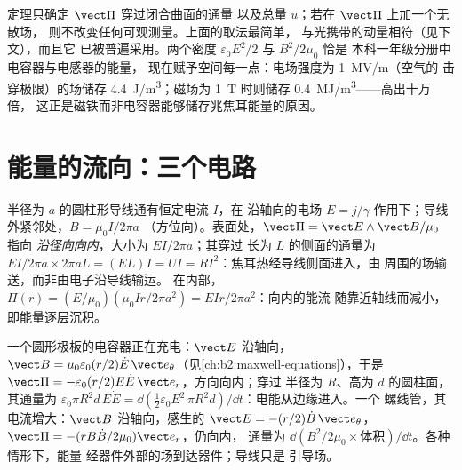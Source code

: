 \begin{remark}\label{rem:b2:poynting-vector:interpretation}
定理只确定 $\vect\Pi$ 穿过闭合曲面的通量
以及总量 $u$；若在 $\vect\Pi$ 上加一个无散场，
则不改变任何可观测量。上面的取法最简单，
与光携带的动量相符（见下文），而且它
已被普遍采用。两个密度 $\varepsilon_0E^2/2$ 与 $B^2/2\mu_0$ 恰是
本科一年级分册中电容器与电感器的能量，
现在赋予空间每一点：电场强度为 \qty{1}{MV/m}（空气的
击穿极限）的场储存 \qty{4.4}{J/m^3}；磁场为 \qty{1}{T}
时则储存 \qty{0.4}{MJ/m^3}——高出十万倍，
这正是磁铁而非电容器能够储存兆焦耳能量的原因。
\end{remark}

\section{能量的流向：三个电路}

\begin{example}[有电阻的导线]\label{ex:b2:poynting-vector:wire}
半径为 $a$ 的圆柱形导线通有恒定电流 $I$，在
沿轴向的电场 $E = j/\gamma$ 作用下；导线外紧邻处，$B = \mu_0I/2\pi a$
（方位向）。表面处，$\vect\Pi = \vect E\wedge\vect B/\mu_0$ 指向
\emph{沿径向向内}，大小为 $EI/2\pi a$；其穿过
长为 $L$ 的侧面的通量为 $EI/2\pi a\times2\pi aL = (EL)I = UI =
RI^2$：焦耳热经导线侧面进入，由
周围的场输送，而非由电子沿导线输运。
在内部，$\Pi(r) = (E/\mu_0)(\mu_0Ir/2\pi a^2) = EIr/2\pi a^2$：向内的能流
随靠近轴线而减小，即能量逐层沉积。
\end{example}

\begin{example}[电容器与螺线管]\label{ex:b2:poynting-vector:capsol}
一个圆形极板的电容器正在充电：$\vect E$ 沿轴向，$\vect B =
\mu_0\varepsilon_0(r/2)\dot E\,\vect e_\theta$（见\cref{ch:b2:maxwell-equations}），于是
$\vect\Pi = -\varepsilon_0(r/2)E\dot E\,\vect e_r$，方向向内；穿过
半径为 $R$、高为 $d$ 的圆柱面，其通量为 $\varepsilon_0\pi R^2d\,E\dot E = \dd(\tfrac12
\varepsilon_0E^2\,\pi R^2d)/\dd t$：电能从边缘进入。一个
螺线管，其电流增大：$\vect B$ 沿轴向，感生的 $\vect E = -(r/2)
\dot B\,\vect e_\theta$，$\vect\Pi = -(rB\dot B/2\mu_0)\vect e_r$，仍向内，
通量为 $\dd(B^2/2\mu_0\times\text{体积})/\dd t$。各种情形下，能量
经器件外部的场到达器件；导线只是
引导场。
\end{example}

